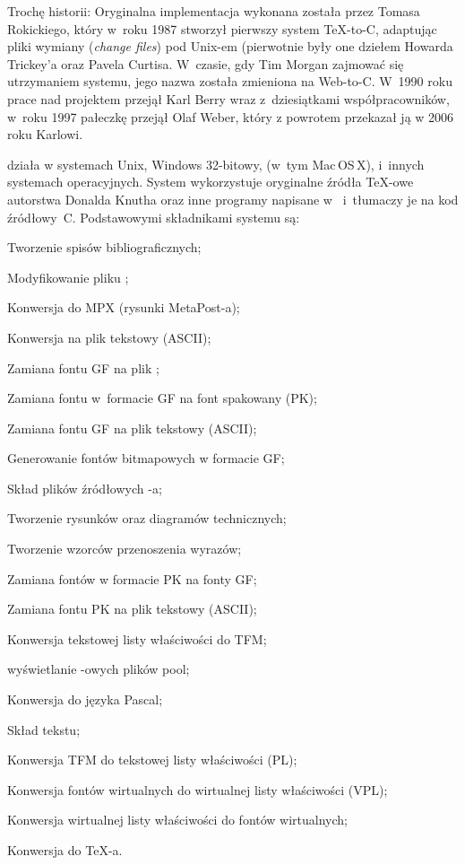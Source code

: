 \documentclass{article}
\begin{document}
Trochę historii: Oryginalna implementacja wykonana została przez Tomasa Rokickiego, który
w~roku 1987 stworzył pierwszy system \TeX{}-to-C, adaptując pliki wymiany
(\emph{change files}) pod Unix-em (pierwotnie były one dziełem Howarda
Trickey'a oraz Pavela Curtisa.  W~czasie, gdy Tim Morgan zajmować się  utrzymaniem
systemu, jego nazwa została zmieniona na Web-to-C\@. W~1990 roku prace nad
projektem przejął Karl Berry wraz z~dziesiątkami współpracowników, w~roku
1997 pałeczkę przejął Olaf Weber, który z powrotem przekazał ją w 2006 roku Karlowi.


\Webc{} działa w systemach Unix, Windows 32-bitowy, (w~tym Mac\,OS\,X),
 i~innych systemach operacyjnych.
System wykorzystuje oryginalne źródła \TeX-owe autorstwa Donalda Knutha
oraz inne programy napisane w~\web{} i~tłumaczy je na kod źródłowy~C.
Podstawowymi składnikami systemu są:

\begin{cmddescription}
\item[bibtex]    Tworzenie spisów bibliograficznych;
\item[dvicopy]   Modyfikowanie pliku \dvi;
\item[dvitomp]   Konwersja \dvi{} do MPX (rysunki MetaPost-a);
\item[dvitype]   Konwersja \dvi{} na plik tekstowy (ASCII);
\item[gftodvi]   Zamiana fontu GF na plik \dvi;
\item[gftopk]    Zamiana fontu w~formacie GF na font spakowany (PK);
\item[gftype]    Zamiana fontu GF na plik tekstowy (ASCII);
\item[mf]        Generowanie fontów bitmapowych w formacie GF;
\item[mft]       Skład plików źródłowych \MF{}-a;
\item[mpost]     Tworzenie rysunków oraz diagramów technicznych;
\item[patgen]    Tworzenie wzorców przenoszenia wyrazów;
\item[pktogf]    Zamiana fontów w formacie PK na fonty GF;
\item[pktype]    Zamiana fontu PK na plik tekstowy (ASCII);
\item[pltotf]    Konwersja tekstowej listy właściwości do TFM;
\item[pooltype]  wyświetlanie \web-owych plików pool;
\item[tangle]    Konwersja \web{} do języka Pascal;
\item[tex]       Skład tekstu;
\item[tftopl]    Konwersja TFM do tekstowej listy właściwości (PL);
\item[vftovp]    Konwersja fontów wirtualnych do wirtualnej listy
                 właściwości (VPL);
\item[vptovf]    Konwersja wirtualnej listy właściwości do fontów wirtualnych;
\item[weave]     Konwersja \web{} do \TeX-a.
\end{cmddescription}
\end{document}
